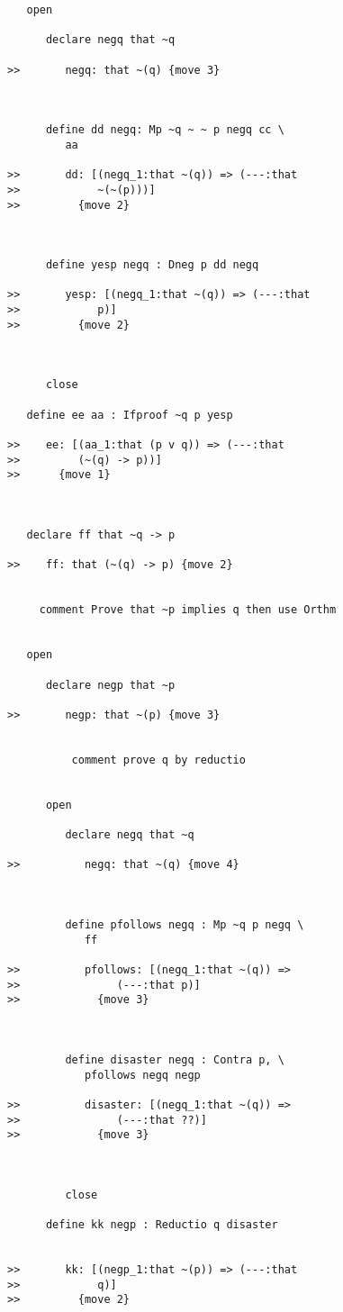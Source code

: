 \documentclass[12pt]{article}
\begin{document}
\begin{verbatim}
   open

      declare negq that ~q

>>       negq: that ~(q) {move 3}



      define dd negq: Mp ~q ~ ~ p negq cc \
         aa

>>       dd: [(negq_1:that ~(q)) => (---:that
>>            ~(~(p)))]
>>         {move 2}



      define yesp negq : Dneg p dd negq

>>       yesp: [(negq_1:that ~(q)) => (---:that
>>            p)]
>>         {move 2}



      close

   define ee aa : Ifproof ~q p yesp

>>    ee: [(aa_1:that (p v q)) => (---:that
>>         (~(q) -> p))]
>>      {move 1}



   declare ff that ~q -> p

>>    ff: that (~(q) -> p) {move 2}


     comment Prove that ~p implies q then use Orthm


   open

      declare negp that ~p

>>       negp: that ~(p) {move 3}


          comment prove q by reductio


      open

         declare negq that ~q

>>          negq: that ~(q) {move 4}



         define pfollows negq : Mp ~q p negq \
            ff

>>          pfollows: [(negq_1:that ~(q)) =>
>>               (---:that p)]
>>            {move 3}



         define disaster negq : Contra p, \
            pfollows negq negp

>>          disaster: [(negq_1:that ~(q)) =>
>>               (---:that ??)]
>>            {move 3}



         close

      define kk negp : Reductio q disaster


>>       kk: [(negp_1:that ~(p)) => (---:that
>>            q)]
>>         {move 2}




\end{verbatim}
\end{document}
